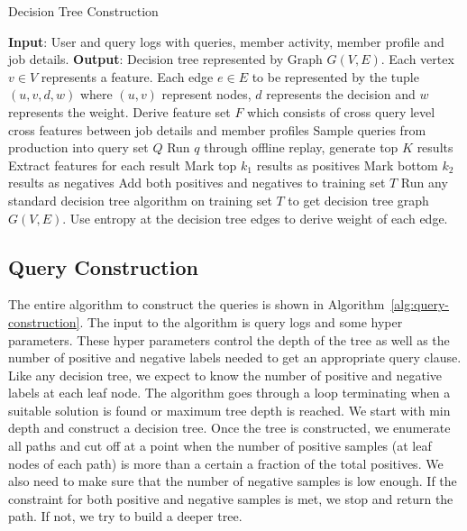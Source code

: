 \begin{algorithm}
\caption{Decision Tree Construction}\label{alg:decision-tree2}
\begin{algorithmic}[1]
  \State \textbf{Input}: User and query logs with queries, member activity, member profile and job
  details.
  \State \textbf{Output}: Decision tree represented by Graph $G(V, E)$.
  Each vertex $v \in V$ represents a feature. 
  Each edge $e \in E$ to be represented by the tuple
  $(u, v, d, w)$ where $(u, v)$ represent nodes, $d$ represents the decision
  and $w$ represents the weight.
  \State Derive feature set $F$ which consists of cross query level cross
  features between job details and member profiles
  \State Sample queries from production into query set $Q$
    \State Run $q$ through offline replay, generate top $K$ results
    \State Extract features for each result
    \State Mark top $k_1$ results as positives
    \State Mark bottom $k_2$ results as negatives
    \State Add both positives and negatives to training set $T$
  \EndFor
  \State Run any standard decision tree algorithm on training set $T$ to get
  decision tree graph $G(V, E)$. Use entropy at the decision tree edges to
  derive weight of each edge.
  \State %
\end{algorithmic}
\end{algorithm}

\subsection{Query Construction}

The entire algorithm to construct the queries is shown in
Algorithm~\ref{alg:query-construction}. The input to the algorithm is query
logs and some hyper parameters. These hyper parameters control the depth of the
tree as well as the number of positive and negative labels needed to get an
appropriate query clause. Like any decision tree, we expect to know the number
of positive and negative labels at each leaf node. The algorithm goes through a
loop terminating when a suitable solution is found or maximum tree depth is
reached. We start with min depth and construct a decision tree. Once the tree
is constructed, we enumerate all paths and cut off at a point when the number of
positive samples (at leaf nodes of each path) is more than a certain a fraction
of the total positives. We also need to make sure that the number of negative
samples is low enough. If the constraint for both positive and negative samples
is met, we stop and return the path. If not, we try to build a deeper tree.

